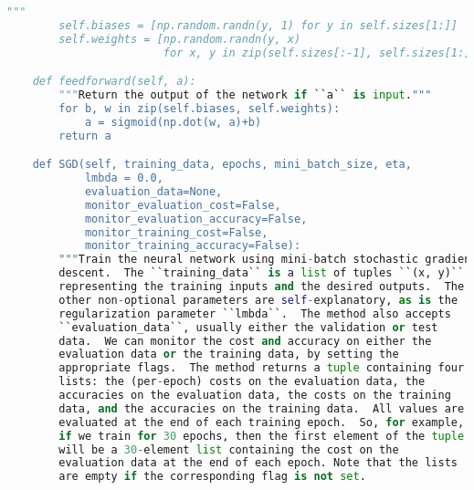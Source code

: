 \begin{lstlisting}[language=Python]
        """
        self.biases = [np.random.randn(y, 1) for y in self.sizes[1:]]
        self.weights = [np.random.randn(y, x)
                        for x, y in zip(self.sizes[:-1], self.sizes[1:])]

    def feedforward(self, a):
        """Return the output of the network if ``a`` is input."""
        for b, w in zip(self.biases, self.weights):
            a = sigmoid(np.dot(w, a)+b)
        return a

    def SGD(self, training_data, epochs, mini_batch_size, eta,
            lmbda = 0.0,
            evaluation_data=None,
            monitor_evaluation_cost=False,
            monitor_evaluation_accuracy=False,
            monitor_training_cost=False,
            monitor_training_accuracy=False):
        """Train the neural network using mini-batch stochastic gradient
        descent.  The ``training_data`` is a list of tuples ``(x, y)``
        representing the training inputs and the desired outputs.  The
        other non-optional parameters are self-explanatory, as is the
        regularization parameter ``lmbda``.  The method also accepts
        ``evaluation_data``, usually either the validation or test
        data.  We can monitor the cost and accuracy on either the
        evaluation data or the training data, by setting the
        appropriate flags.  The method returns a tuple containing four
        lists: the (per-epoch) costs on the evaluation data, the
        accuracies on the evaluation data, the costs on the training
        data, and the accuracies on the training data.  All values are
        evaluated at the end of each training epoch.  So, for example,
        if we train for 30 epochs, then the first element of the tuple
        will be a 30-element list containing the cost on the
        evaluation data at the end of each epoch. Note that the lists
        are empty if the corresponding flag is not set.


\end{lstlisting}

